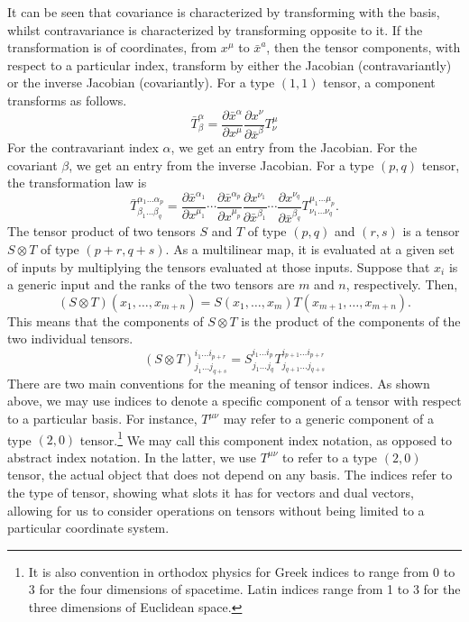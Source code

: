 \documentclass[a4paper,12pt]{article}
\begin{document}
It can be seen that covariance is characterized by transforming with the basis, whilst contravariance is characterized by transforming opposite to it.
If the transformation is of coordinates, from $x^\mu$ to $\bar{x}^a$, then the tensor components, with respect to a particular index, transform by either the Jacobian (contravariantly) or the inverse Jacobian (covariantly).
For a type $(1,1)$ tensor, a component transforms as follows.
\begin{equation}
    \bar{T}^\alpha_\beta = \frac{\partial \bar{x}^\alpha}{\partial x^\mu} \frac{\partial x^\nu}{\partial \bar{x}^\beta} T^\mu_\nu
\end{equation}
For the contravariant index $\alpha$, we get an entry from the Jacobian.
For the covariant $\beta$, we get an entry from the inverse Jacobian.
For a type $(p, q)$ tensor, the transformation law is
\begin{equation}
    \bar{T}^{\alpha_1 \ldots \alpha_p}_{\beta_1 \ldots \beta_q} = \frac{\partial \bar{x}^{\alpha_1}}{\partial x^{\mu_1}} \cdots \frac{\partial \bar{x}^{\alpha_p}}{\partial x^{\mu_p}} \frac{\partial x^{\nu_1}}{\partial \bar{x}^{\beta_1}} \cdots \frac{\partial x^{\nu_q}}{\partial \bar{x}^{\beta_q}} T^{\mu_1 \ldots \mu_p}_{\nu_1 \ldots \nu_q}.
\end{equation}
The tensor product of two tensors $S$ and $T$ of type $(p, q)$ and $(r, s)$ is a tensor $S \otimes T$ of type $(p + r, q + s)$.
As a multilinear map, it is evaluated at a given set of inputs by multiplying the tensors evaluated at those inputs.
Suppose that $x_{i}$ is a generic input and the ranks of the two tensors are $m$ and $n$, respectively.
Then,
\begin{equation}
    (S \otimes T)(x_1, \ldots, x_{m+n}) = S(x_1, \ldots, x_m) T(x_{m+1}, \ldots, x_{m+n}).
\end{equation}
This means that the components of $S \otimes T$ is the product of the components of the two individual tensors.
\begin{equation}
    (S \otimes T)^{i_1 \ldots i_{p+r}}_{j_1 \ldots j_{q+s}} = S^{i_1 \ldots i_p}_{j_1 \ldots j_q} T^{i_{p+1} \ldots i_{p+r}}_{j_{q+1} \ldots j_{q+s}}
\end{equation}
There are two main conventions for the meaning of tensor indices.
As shown above, we may use indices to denote a specific component of a tensor with respect to a particular basis.
For instance, $T^{\mu \nu}$ may refer to a generic component of a type $(2, 0)$ tensor.\footnote{It is also convention in orthodox physics for Greek indices to range from $0$ to $3$ for the four dimensions of spacetime. Latin indices range from 1 to 3 for the three dimensions of Euclidean space.}
We may call this component index notation, as opposed to abstract index notation.
In the latter, we use $T^{\mu \nu}$ to refer to a type $(2, 0)$ tensor, the actual object that does not depend on any basis.
The indices refer to the type of tensor, showing what slots it has for vectors and dual vectors, allowing for us to consider operations on tensors without being limited to a particular coordinate system.
\end{document}
